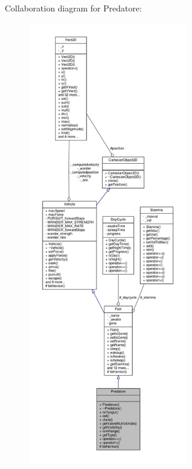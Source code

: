 Collaboration diagram for Predatore\+:\nopagebreak
\begin{figure}[H]
\begin{center}
\leavevmode
\includegraphics[height=550pt]{classPredatore__coll__graph}
\end{center}
\end{figure}
